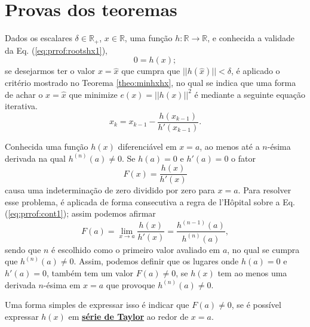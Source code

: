 \section{Provas dos teoremas}
 
\begin{myproofT}\label{proof:theo:rootshx}
Dados
os escalares $\delta \in \mathbb{R}_+$, 
$x \in \mathbb{R}$, 
uma função $h:\mathbb{R} \rightarrow \mathbb{R}$, e 
conhecida a validade da Eq. (\ref{eq:prrof:rootshx1}),
\begin{equation}\label{eq:prrof:rootshx1}
0=h(x);
\end{equation}
se desejarmos ter o valor $x=\hat{x}$ que cumpra que $||h(\hat{x})||<\delta$, 
é aplicado o critério mostrado no Teorema \ref{theo:minhxhx}, no qual se indica que uma forma de achar o 
$x=\hat{x}$ que minimize $e(x)=||h(x)||^2$ é mediante a seguinte equação iterativa.  
\begin{equation}\label{eq:prrof:rootshx1:2}
x_{k}=x_{k-1}-\frac{h(x_{k-1})}{h'(x_{k-1})}.
\end{equation}

\end{myproofT}

\begin{myproofT}\label{proof:theo:cont:rootshx}
Conhecida uma função $h(x)$  diferenciável em $x=a$, 
ao menos até a $n$-ésima derivada na qual $h^{(n)}(a)\neq 0$.
Se $h(a)=0$ e $h'(a)=0$ o fator
\begin{equation}\label{eq:prrof:cont1}
F(x)=\frac{h(x)}{h'(x)}
\end{equation}
causa uma indeterminação de zero dividido por zero para $x=a$.
Para resolver esse problema, é aplicada de forma consecutiva a regra de l'Hôpital
sobre a Eq. (\ref{eq:prrof:cont1}); assim podemos afirmar
\begin{equation}\label{eq:prrof:cont2}
F(a)=\lim_{x\rightarrow a}\frac{h(x)}{h'(x)}=\frac{h^{(n-1)}(a)}{h^{(n)}(a)},
\end{equation}
sendo que $n$ é escolhido como o primeiro valor avaliado em $a$, 
no qual se cumpra que $h^{(n)}(a)\neq 0$. 
Assim, podemos definir que os lugares onde $h(a)=0$ e $h'(a)=0$,
 também tem um valor $F(a)\neq 0$,
se $h(x)$ tem ao menos uma derivada $n$-ésima em $x=a$ que provoque $h^{(n)}(a)\neq 0$.

Uma forma simples de expressar isso é indicar que $F(a)\neq 0$, se é possível
expressar $h(x)$ em \hyperref[def:taylor]{\textbf{série de Taylor}} ao redor de $x=a$. 
\end{myproofT}

